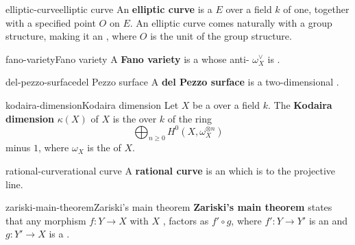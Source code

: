 \begin{topic}{elliptic-curve}{elliptic curve}
    An \textbf{elliptic curve} is a    $E$ over a field $k$ of  one, together with a specified point $O$ on $E$. An elliptic curve comes naturally with a group structure, making it an , where $O$ is the unit of the group structure.
\end{topic}

\begin{topic}{fano-variety}{Fano variety}
    A \textbf{Fano variety} is a  whose anti- $\omega_X^\vee$ is .
\end{topic}

\begin{topic}{del-pezzo-surface}{del Pezzo surface}
    A \textbf{del Pezzo surface} is a two-dimensional .
\end{topic}

\begin{topic}{kodaira-dimension}{Kodaira dimension}
    Let $X$ be a  over a field $k$. The \textbf{Kodaira dimension} $\kappa(X)$ of $X$ is the  over $k$ of the ring
    \[ \bigoplus_{n \ge 0} H^0(X, \omega_X^{\otimes n}) \]
    minus $1$, where $\omega_X$ is the  of $X$.
\end{topic}

\begin{topic}{rational-curve}{rational curve}
    A \textbf{rational curve} is an  which is  to the projective line.
\end{topic}

\begin{topic}{zariski-main-theorem}{Zariski's main theorem}
    \textbf{Zariski's main theorem} states that any   morphism $f : Y \to X$ with $X$ , factors as $f' \circ g$, where $f' : Y \to Y'$ is an  and $g : Y' \to X$ is a .
\end{topic}

